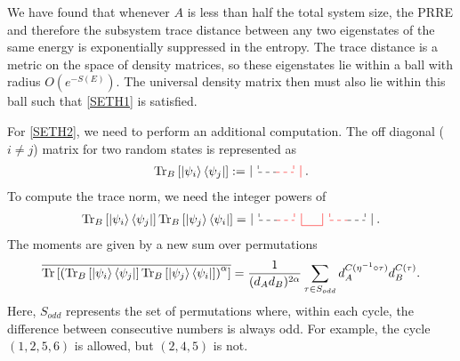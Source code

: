 \documentclass[a4paper,11pt]{article}
\newcommand{\Tr}{\text{Tr}}
\begin{document}
We have found that whenever $A$ is less than half the total system size, the PRRE and therefore the subsystem trace distance between any two eigenstates of the same energy is exponentially suppressed in the entropy. The trace distance is a metric on the space of density matrices, so these eigenstates lie within a ball with radius $O(e^{-S(E)})$. The universal density matrix then must also lie within this ball such that \eqref{SETH1} is satisfied.


For \eqref{SETH2}, we need to perform an additional computation. The off diagonal ($i\neq j$) matrix for two random states is represented as
\begin{align}
    \label{eq:rho_offdiag}
    \Tr_B\left[\ket{\psi_i}\bra{\psi_j} \right]
:= %
\,
    \tikz[scale=1.0,baseline=-0.5ex]{
    \draw[dashed] (0,0.2)  -- (0,0);
    \draw[dashed] (0,0)  -- (0.5,0);
    \draw[dashed,red] (0.5,0)  -- (1,0);
    \draw[dashed,red]  (1,0.2)  -- (1,0);
    \draw[] (-0.2,0.2)-- (-0.2,-0.15);
    \draw[red] (1.2,0.2) -- (1.2,-0.15);
    }\ .
\end{align}
To compute the trace norm, we need the integer powers of 
\begin{align}
    \label{eq:rho_offdiag_square}
    \Tr_B\left[\ket{\psi_i}\bra{\psi_j} \right]\Tr_B\left[\ket{\psi_j}\bra{\psi_i} \right]
= %
\,
    \tikz[scale=1.0,baseline=-0.5ex]{
    \draw[dashed] (0,0.2)  -- (0,0);
    \draw[dashed] (0,0)  -- (0.5,0);
    \draw[dashed,red] (0.5,0)  -- (1,0);
    \draw[dashed,red]  (1,0.2)  -- (1,0);
    \draw[] (-0.2,0.2)-- (-0.2,-0.15);
    \draw[red] (1.2,0.2) -- (1.2,-0.15);
     \draw[dashed,red] (2,0.2)  -- (2,0);
    \draw[dashed,red] (2,0)  -- (2.5,0);
    \draw[dashed,] (2.5,0)  -- (3,0);
    \draw[dashed,]  (3,0.2)  -- (3,0);
    \draw[red] (2-0.2,0.2)-- (2-0.2,-0.15);
    \draw[] (3.2,0.2) -- (3.2,-0.15);
    \draw[red]  (1.2,-0.15)-- (2-0.2,-0.15);
    }\ .
\end{align}
The moments are given by a new sum over permutations
\begin{align}
    \overline{\Tr\left[ \left(\Tr_B\left[\ket{\psi_i}\bra{\psi_j} \right]\Tr_B\left[\ket{\psi_j}\bra{\psi_i} \right]\right)^{\alpha}\right]}= \frac{1}{(d_A d_B)^{2\alpha}}\sum_{\tau \in S_{odd}} d_A^{C(\eta^{-1}\circ \tau)}d_B^{C( \tau) }.
\end{align}
Here, $S_{odd}$ represents the set of permutations where, within each cycle, the difference between consecutive numbers is always odd. For example, the cycle $(1,2,5,6)$ is allowed, but $(2,4,5)$ is not.
\end{document}
